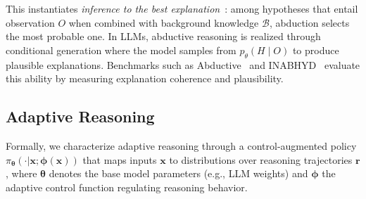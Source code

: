\documentclass[11pt]{article}
\begin{document}
This instantiates \emph{inference to the best explanation}~\citep{Baker2022-BAKSSE-2}:
among hypotheses that entail observation $O$ when combined with background knowledge 
$\mathcal{B}$, abduction selects the most probable one.
In LLMs, abductive reasoning is realized through conditional generation where the 
model samples from $p_\theta(H \mid O)$ to produce plausible explanations.
Benchmarks such as Abductive~\citep{bhagavatula2020abductivecommonsensereasoning} 
and INABHYD~\citep{SunSaparov2025Occam} evaluate this ability by measuring 
explanation coherence and plausibility.


\subsection{Adaptive Reasoning}
\label{sec:transfer-to-adaptive}

Formally, we characterize adaptive reasoning through a {control-augmented policy} 
$\pi_{\boldsymbol{\theta}}(\cdot|\mathbf{x};\boldsymbol{\phi}(\mathbf{x}))$ that maps inputs $\mathbf{x}$ 
to distributions over reasoning trajectories $\boldsymbol{r}$, 
where $\boldsymbol{\theta}$ denotes the base model parameters (e.g., LLM weights) 
and $\boldsymbol{\phi}$ the adaptive control function regulating reasoning behavior.
\end{document}
